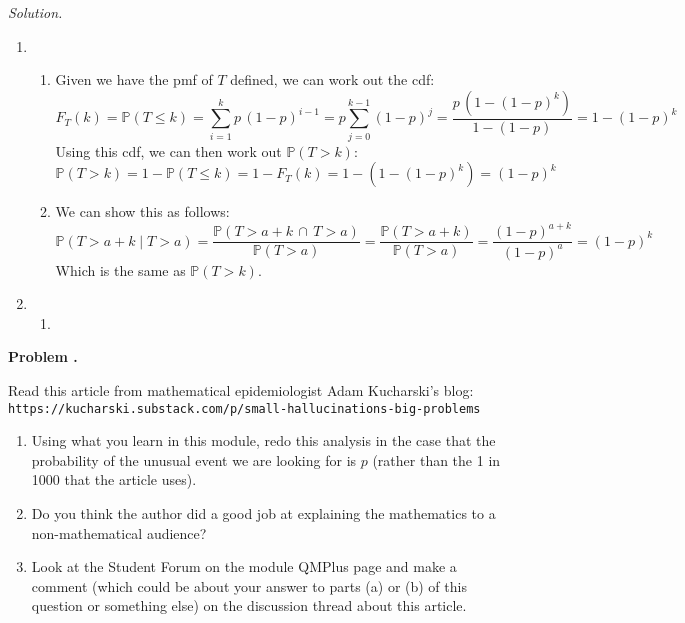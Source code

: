 \documentclass[11pt]{article}
\newcounter{problem}
\newenvironment{problem}[1][]{%
  \refstepcounter{problem}%
  \bigskip\noindent\textbf{Problem \theproblem. #1}\par\smallskip\noindent
}{\bigskip}
\newenvironment{solution}{%
  \noindent\textit{Solution.}\quad
}{\par\bigskip}
\begin{document}
\begin{solution}
\begin{enumerate}
      \item \begin{enumerate}[label=(\roman*)]
            \item Given we have the pmf of $T$ defined, we can work out the cdf:
                  \[
                  F_T(k) = \mathbb{P}(T \le k) = \sum_{i=1}^{k}{p \, (1 - p)^{i - 1}}
                        = p \sum_{j=0}^{k-1}{(1 - p)^{j}} = \frac{p \, (1 - (1 - p)^{k})}
                        {1 - (1 - p)} = {1 - (1 - p)^{k}}
                  \]
                  Using this cdf, we can then work out $\mathbb{P}(T > k)$:
                  \[
                  \mathbb{P}(T > k) = 1 - \mathbb{P}(T \le k) = 1 - F_T(k) = 
                        1 - \left({1 - (1 - p)^{k}}\right) = {(1 - p)^{k}}
                  \]
            \item We can show this as follows:
                  \[
                  \mathbb{P}(T > a + k \mid T > a) = \frac{\mathbb{P}(T > a + k
                        \, \cap \, T > a)}{\mathbb{P}(T > a)}
                        = \frac{\mathbb{P}(T > a + k)}{\mathbb{P}(T > a)}
                        = \frac{(1 - p)^{a + k}}{(1 - p)^{a}} = {(1 - p)^k}
                  \]
                  Which is the same as $\mathbb{P}(T > k)$.
            \end{enumerate}
      \item \begin{enumerate}[label=(\roman*)]
            \item 
            \end{enumerate}
\end{enumerate}
\end{solution}

\begin{problem}
Read this article from mathematical epidemiologist Adam Kucharski's blog: \\
\texttt{https://kucharski.substack.com/p/small-hallucinations-big-problems}
\begin{enumerate}
      \item Using what you learn in this module, redo this analysis in the case 
            that the probability of the unusual event we are looking for is $p$ 
            (rather than the 1 in 1000 that the article uses).
      \item Do you think the author did a good job at explaining the mathematics 
            to a non-mathematical audience?
      \item Look at the Student Forum on the module QMPlus page and make a comment 
            (which could be about your answer to parts (a) or (b) of this question 
            or something else) on the discussion thread about this article.
\end{enumerate}
\end{problem}
\end{document}
